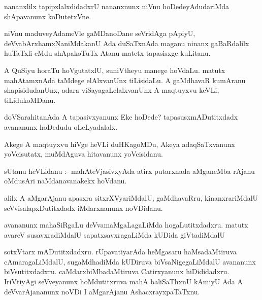 \documentclass{article}
\begin{document}
\begin{mn}
nananxlilx tapipxlalxdidadxrU nananxnunx niVnu hoDedeyAdudariMda shApavanunx koDutetxVne. 
\end{mn}

\begin{mn}
niVnu maduveyAdameVle gaMDanoDane seVridAga pApiyU, deVvabArxhamxNaniMdakanU Ada 
duSaTxnAda maganu ninanx gaBaRdalilx huTaTxli eMdu shApakoTuTx Atanu matetx tapasisxge kuLitanu.
\end{mn}

\begin{mn}
A QuSiyu horaTu hoVgutatxlU,  suniVtheyu manege hoVdaLu.  matutx mahAtamxnAda 
taMdege elAlxvanUnx tiLisidaLu. A gaMdhavaR kumAranu shapisidudanUnx,  adara 
viSayagaLelalxvanUnx A maqtuyxvu keVLi,  tiLidukoMDanu. 
\end{mn}

\begin{mn}
doVSarahitanAda A tapasivxyanunx Eke hoDede?    tapasusxmADutitxdadx avananunx hoDedudu oLeLyadalalx.
\end{mn}

\begin{mn}
Akege A maqtuyxvu hiVge heVLi duHKagoMDu, Akeya adaqSaTxvanunx yoVcisutatx, muMdAguva hitavanunx yoVcisidanu. 
\end{mn}

\begin{mn}
sUtanu heVLidanu :- mahAteVjasivxyAda atirx putarxnada aMganeMba rAjanu oMdusAri naMdanavanakekx hoVdanu.
\end{mn}

\begin{mn}
alilx A aMgarAjanu apasxra sitxrXVyariMdalU, gaMdhavaRru, kinanxrariMdalU seVvisalapxDutitxdadx iMdarxnanunx noVDidanu.
\end{mn}

\begin{mn}
avananunx mahaSiRgaLu deVvamaMgaLagaLiMda  hogaLutitxdadxru. matutx avareV susavxradiMdalU sapatxsavxragaLiMda kUDida  giVtadiMdalU
\end{mn}

\begin{mn}
sotxVtarx mADutitxdadxru.  rUpavatiyarAda heMgasaru haMsadaMtiruva cAmaragaLiMdalU, 
sugaMdhadiMda kUDiruva biVsaNigegaLiMdalU avananunx biVsutitxdadxru.  
caMdarxbiMbadaMtiruva Catirxyanunx hiDididadxru. IriVtiyAgi seVveyanunx 
hoMdutitxruva  mahA baliSaThxnU  kAmiyU Ada A deVvarAjananunx noVDi I aMgarAjanu AshacxrayxpaTaTxnu.
\end{mn}
\end{document}
